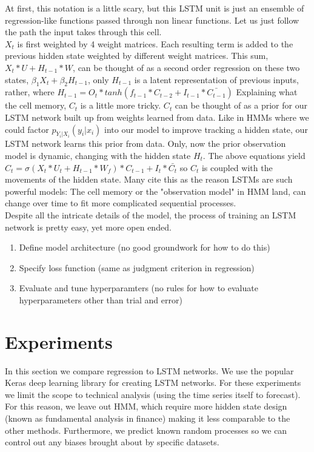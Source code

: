 \documentclass{article}
\begin{document}
\noindent At first, this notation is a little scary, but this LSTM unit is just an ensemble of regression-like functions passed through non linear functions. Let us just follow the path the input takes through this cell. \\

\noindent $X_t$ is first weighted by 4 weight matrices. Each resulting term is added to the previous hidden state weighted by different weight matrices. This sum, $X_t*U+H_{t-1}*W$, can be thought of as a second order regression on these two states, $\beta_1X_t+\beta_2H_{t-1}$, only $H_{t-1}$ is a latent representation of previous inputs, rather, where $H_{t-1} = O_t * tanh(f_{t-1} * C_{t-2} + I_{t-1} * \bar{C_{t-1}})$ Explaining what the cell memory, $C_t$ is a little more tricky. $C_t$ can be thought of as a prior for our LSTM network built up from weights learned from data. Like in HMMs where we could factor $p_{Y_i|X_{i}}(y_i|x_{i})$ into our model to improve tracking a hidden state, our LSTM network learns this prior from data. Only, now the prior observation model is dynamic, changing with the hidden state $H_t$. The above equations yield $C_t = \sigma(X_t * U_t + H_{t-1} * W_f) * C_{t-1} + I_t * \bar{C_t}$ so $C_t$ is coupled with the movements of the hidden state. Many cite this as the reason LSTMs are such powerful models: The cell memory or the "observation model" in HMM land, can change over time to fit more complicated sequential processes.\\

\noindent Despite all the intricate details of the model, the process of training an LSTM network is pretty easy, yet more open ended.
\begin{enumerate}
  \item Define model architecture (no good groundwork for how to do this)
  \item Specify loss function (same as judgment criterion in regression)
  \item Evaluate and tune hyperparamters (no rules for how to evaluate hyperparameters other than
  trial and error)
\end{enumerate}

\section{Experiments}
In this section we compare regression to LSTM networks. We use the popular Keras deep learning library for creating LSTM networks. For these experiments we limit the scope to technical analysis (using the time series itself to forecast). For this reason, we leave out HMM, which require more hidden state design (known as fundamental analysis in finance) making it less comparable to the other methods. Furthermore, we predict known random processes so we can control out any biases brought about by specific datasets.
\end{document}
